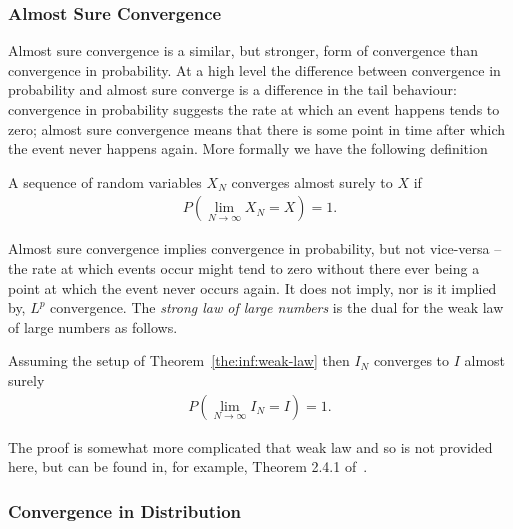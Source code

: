 \subsubsection{Almost Sure Convergence}
\label{sec:inf:mc:conv:as}

Almost sure convergence is a similar, but stronger, form of convergence than convergence in
probability.  At a high level the difference between
convergence in probability and almost sure converge is a difference in the tail behaviour:
convergence in probability suggests the rate at which an event happens tends to zero; almost
sure convergence means that there is some point in time after which the event never happens
again.  More formally we have the following definition
\begin{definition}
A sequence of random variables $X_N$ converges almost surely to $X$ if
\begin{align}
	P\left(\lim\limits_{N\rightarrow\infty} X_N=X\right)=1.
\end{align}
\end{definition}
Almost sure convergence implies convergence in probability, but not vice-versa -- the rate
at which events occur might tend to zero without there ever being a point at which the
event never occurs again.  It does not imply, nor is it implied by, $L^p$ convergence.
The \emph{strong law of large numbers} is the dual for the weak law of large numbers as
follows.
\begin{theorem}
	Assuming the setup of Theorem~\ref{the:inf:weak-law} then $I_N$ converges to $I$ almost surely
	\begin{align}
	P\left(\lim\limits_{N\rightarrow\infty} I_N=I\right)=1.
	\end{align}
\end{theorem}
The proof is somewhat more complicated that weak law and so is not provided here, but can
be found in, for example, Theorem 2.4.1 of~\cite{durrett2010probability}.

\subsubsection{Convergence in Distribution}
\label{sec:inf:mc:conv:dist}

